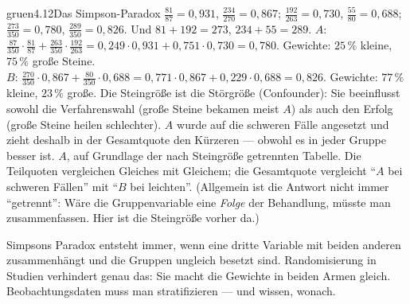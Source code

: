 \begin{loesungkarte}{gruen}{4.12}{Das Simpson-Paradox}
$\frac{81}{87} = 0{,}931$, $\frac{234}{270} = 0{,}867$; $\frac{192}{263} = 0{,}730$, $\frac{55}{80} = 0{,}688$; $\frac{273}{350} = 0{,}780$, $\frac{289}{350} = 0{,}826$. Und $81 + 192 = 273$, $234 + 55 = 289$. \checkmark
{}
$A$: $\frac{87}{350}\cdot\frac{81}{87} + \frac{263}{350}\cdot\frac{192}{263} = 0{,}249\cdot0{,}931 + 0{,}751\cdot0{,}730 = 0{,}780$. Gewichte: $25\,\%$ kleine, $75\,\%$ große Steine. \\
$B$: $\frac{270}{350}\cdot0{,}867 + \frac{80}{350}\cdot0{,}688 = 0{,}771\cdot0{,}867 + 0{,}229\cdot0{,}688 = 0{,}826$. Gewichte: $77\,\%$ kleine, $23\,\%$ große.
Die Steingröße ist die Störgröße (Confounder): Sie beeinflusst sowohl die Verfahrenswahl (große Steine bekamen meist $A$) als auch den Erfolg (große Steine heilen schlechter). $A$ wurde auf die schweren Fälle angesetzt und zieht deshalb in der Gesamtquote den Kürzeren --- obwohl es in jeder Gruppe besser ist.
$A$, auf Grundlage der nach Steingröße getrennten Tabelle. Die Teilquoten vergleichen Gleiches mit Gleichem; die Gesamtquote vergleicht \enquote{$A$ bei schweren Fällen} mit \enquote{$B$ bei leichten}. (Allgemein ist die Antwort nicht immer \enquote{getrennt}: Wäre die Gruppenvariable eine \emph{Folge} der Behandlung, müsste man zusammenfassen. Hier ist die Steingröße vorher da.)
\begin{mitnehmen}\kastentext
Simpsons Paradox entsteht immer, wenn eine dritte Variable mit beiden anderen zusammenhängt und die Gruppen ungleich besetzt sind. Randomisierung in Studien verhindert genau das: Sie macht die Gewichte in beiden Armen gleich. Beobachtungsdaten muss man stratifizieren --- und wissen, wonach.
\end{mitnehmen}
\end{loesungkarte}

